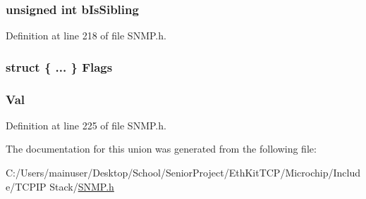 \hypertarget{union_m_i_b___i_n_f_o_a37566bc1a68f219e1d37f7c6aaf23e2f}{}
\subsubsection[{b\+Is\+Sibling}]{\setlength{\rightskip}{0pt plus 5cm}unsigned int b\+Is\+Sibling}\label{union_m_i_b___i_n_f_o_a37566bc1a68f219e1d37f7c6aaf23e2f}


Definition at line 218 of file S\+N\+M\+P.\+h.

\hypertarget{union_m_i_b___i_n_f_o_a6aa8396e7b592abeac512b3cd0655303}{}
\subsubsection[{Flags}]{\setlength{\rightskip}{0pt plus 5cm}struct \{ ... \}   Flags}\label{union_m_i_b___i_n_f_o_a6aa8396e7b592abeac512b3cd0655303}
\hypertarget{union_m_i_b___i_n_f_o_a5ab8c2bf45b20b5f7aa3a4f083896cec}{}
\subsubsection[{Val}]{ Val}\label{union_m_i_b___i_n_f_o_a5ab8c2bf45b20b5f7aa3a4f083896cec}


Definition at line 225 of file S\+N\+M\+P.\+h.



The documentation for this union was generated from the following file\+:\begin{DoxyCompactItemize}
\item 
C\+:/\+Users/mainuser/\+Desktop/\+School/\+Senior\+Project/\+Eth\+Kit\+T\+C\+P/\+Microchip/\+Include/\+T\+C\+P\+I\+P Stack/\hyperlink{_s_n_m_p_8h}{S\+N\+M\+P.\+h}\end{DoxyCompactItemize}
